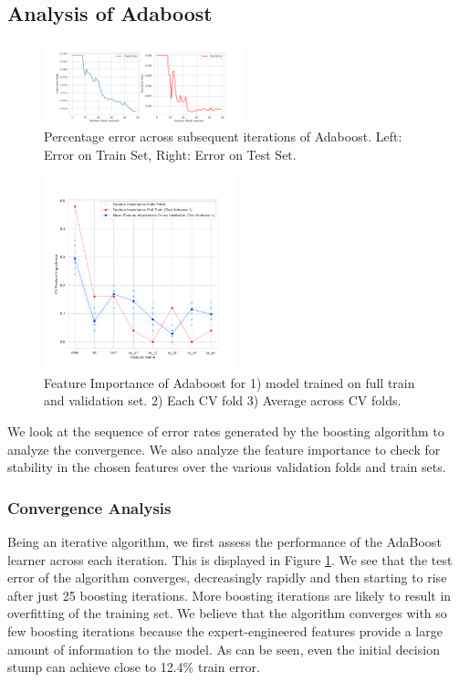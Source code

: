 \documentclass[11pt, letterpaper, journal]{IEEEtran}
\begin{document}
\subsection{Analysis of Adaboost}
\begin{figure}[h]
    \centering
    \includegraphics[width=0.52\textwidth]{statics/ada_iterations_tr_23_te_1.png}
    \caption{Percentage error across subsequent iterations of Adaboost. Left: Error on Train Set, Right: Error on Test Set.}
    \label{fig:Adaboost_iterations}
\end{figure}

\begin{figure}[h]
    \centering
    \includegraphics[width=0.5\textwidth]{statics/Feature_importance_test_scheme1_tr_23_te_1.png}
    \caption{Feature Importance of Adaboost for 1) model trained on full train and validation set. 2) Each CV fold 3) Average across CV folds.}
    \label{fig:Feature_importance ts1}
\end{figure}

We look at the sequence of error rates generated by the boosting algorithm to analyze the convergence. We also analyze the feature importance to check for stability in the chosen features over the various validation folds and train sets.

\subsubsection{Convergence Analysis}
Being an iterative algorithm, we first assess the performance of the AdaBoost learner across each iteration. This is displayed in Figure \ref{fig:Adaboost_iterations}. We see that the test error of the algorithm converges, decreasingly rapidly and then starting to rise after just 25 boosting iterations. More boosting iterations are likely to result in overfitting of the training set. We believe that the algorithm converges with so few boosting iterations because the expert-engineered features provide a large amount of information to the model. As can be seen, even the initial decision stump can achieve close to 12.4\% train error.
\end{document}
